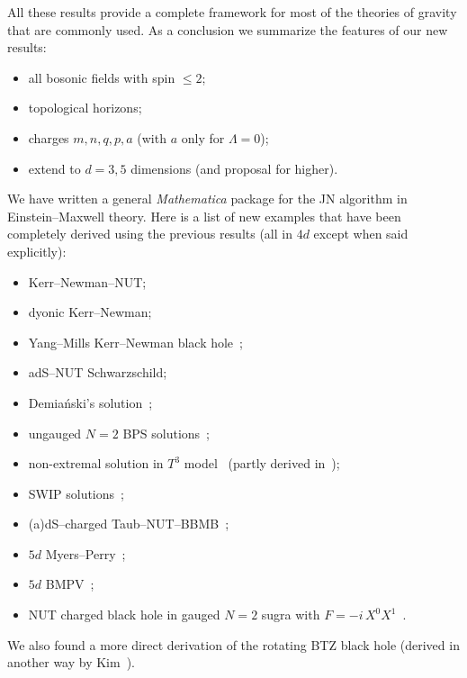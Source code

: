 All these results provide a complete framework for most of the theories of gravity that are commonly used.
As a conclusion we summarize the features of our new results:
\begin{itemize}
	\item all bosonic fields with spin $\le 2$;
	\item topological horizons;
	\item charges $m, n, q, p, a$ (with $a$ only for $\Lambda = 0$);
	\item extend to $d = 3, 5$ dimensions (and proposal for higher).
\end{itemize}
We have written a general \emph{Mathematica} package for the JN algorithm in Einstein--Maxwell theory.\footnotemark{}%
Here is a list of new examples that have been completely derived using the previous results (all in $4d$ except when said explicitly):
\begin{itemize}
	\item Kerr--Newman--NUT;
	\item dyonic Kerr--Newman;
	\item Yang--Mills Kerr--Newman black hole~\cite{Perry:1977:BlackHolesAre};
	\item adS--NUT Schwarzschild;
	\item Demiański's solution~\cite{Demianski:1972:NewKerrlikeSpacetime};
	\item ungauged $N = 2$ BPS solutions~\cite{Behrndt:1998:StationarySolutionsN2};
	\item non-extremal solution in $T^3$ model~\cite{Sen:1992:RotatingChargedBlack} (partly derived in~\cite{Yazadjiev:2000:NewmanJanisMethodRotating});
	\item SWIP solutions~\cite{Bergshoeff:1996:StationaryAxionDilatonSolutions};
	\item (a)dS--charged Taub--NUT--BBMB~\cite{Bardoux:2013:IntegrabilityConformallyCoupled};
	\item $5d$ Myers--Perry~\cite{Myers:1986:BlackHolesHigher};
	\item $5d$ BMPV~\cite{Breckenridge:1997:DbranesSpinningBlack};
	\item NUT charged black hole\footnotemark{} in gauged $N = 2$ sugra with $F = - i\, X^0 X^1$~\cite{Gnecchi:2014:RotatingBlackHoles}.
\end{itemize}
We also found a more direct derivation of the rotating BTZ black hole (derived in another way by Kim~\cite{Kim:1997:NotesSpinningAdS3, Kim:1999:SpinningBTZBlack}).


